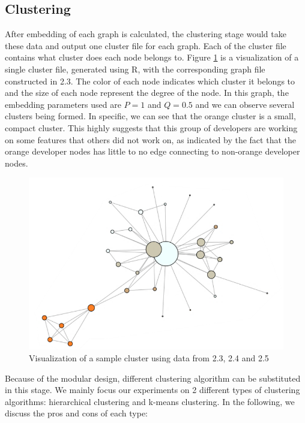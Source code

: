 \documentclass{article}
\begin{document}
\subsection{Clustering}
After embedding of each graph is calculated, the clustering stage would take these data and output one cluster file for each graph. Each of the cluster file contains what cluster does each node belongs to. Figure \ref{fig:clustering} is a visualization of a single cluster file, generated using R, with the corresponding graph file constructed in 2.3. The color of each node indicates which cluster it belongs to and the size of each node represent the degree of the node. In this graph, the embedding parameters used are $P = 1$ and $Q = 0.5$ and we can observe several clusters being formed. In specific, we can see that the orange cluster is a small, compact cluster. This highly suggests that this group of developers are working on some features that others did not work on, as indicated by the fact that the orange developer nodes has little to no edge connecting to non-orange developer nodes.
\begin{figure}[h!]
\centering
\includegraphics[scale=0.5]{images/cluster.png}
\caption{Visualization of a sample cluster using data from 2.3, 2.4 and 2.5}
\label{fig:clustering}
\end{figure}
Because of the modular design, different clustering algorithm can be substituted in this stage. We mainly focus our experiments on 2 different types of clustering algorithms: hierarchical clustering and k-means clustering. In the following, we discuss the pros and cons of each type:\\
\end{document}
